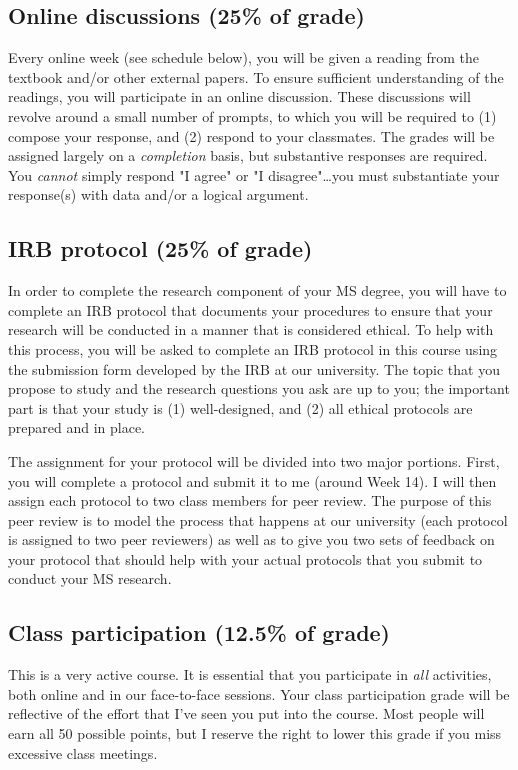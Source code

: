 \documentclass[10pt]{article}
\begin{document}
\subsection*{Online discussions (25\% of grade)}
\label{sec-5-2}
Every online week (see schedule below), you will be given a reading from the textbook and/or other
external papers.  To ensure sufficient understanding of the readings, you will
participate in an online discussion.  These discussions will revolve around a 
small number of prompts, to which you will be required to (1) compose your 
response, and (2) respond to your classmates.  The grades will be assigned
largely on a \emph{completion} basis, but substantive responses are required.  You
\emph{cannot} simply respond "I agree" or "I disagree"\ldots{}you must substantiate
your response(s) with data and/or a logical argument. 

\subsection*{IRB protocol (25\% of grade)}
\label{sec-5-3}
In order to complete the research component of your MS degree, you will have
to complete an IRB protocol that documents your procedures to ensure that your
research will be conducted in a manner that is considered ethical.  To help with
this process, you will be asked to complete an IRB protocol in this course
using the submission form developed by the IRB at our university. 
The topic that you propose to study and the research questions you ask are up 
to you; the important part is that your study is (1) well-designed, and (2) 
all ethical protocols are prepared and in place.

The assignment for your protocol will be divided into two major portions.  First,
you will complete a protocol and submit it to me (around Week 14).  I will then
assign each protocol to two class members for peer review.  The purpose of this
peer review is to model the process that happens at our university (each protocol
is assigned to two peer reviewers) as well as to give you two sets of feedback
on your protocol that should help with your actual protocols that you submit
to conduct your MS research.

\subsection*{Class participation (12.5\% of grade)}
\label{sec-5-4}
This is a very active course.  It is essential that you participate in \emph{all}
activities, both online and in our face-to-face sessions.  Your class participation
grade will be reflective of the effort that I've seen you put into the course.
Most people will earn all 50 possible points, but I reserve the right to lower
this grade if you miss excessive class meetings.
\end{document}
